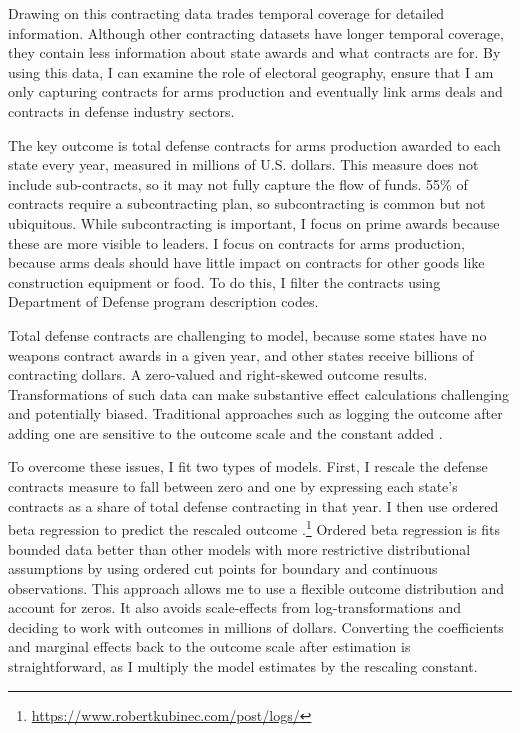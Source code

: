 \documentclass[12pt]{article}
\begin{document}
Drawing on this contracting data trades temporal coverage for detailed information. 
Although other contracting datasets have longer temporal coverage, they contain less information about state awards and what contracts are for. 
By using this data, I can examine the role of electoral geography, ensure that I am only capturing contracts for arms production and 
eventually link arms deals and contracts in defense industry sectors. 


The key outcome is total defense contracts for arms production awarded to each state every year, measured in millions of U.S. dollars.
This measure does not include sub-contracts, so it may not fully capture the flow of funds. 
55\% of contracts require a subcontracting plan, so subcontracting is common but not ubiquitous.  
While subcontracting is important, I focus on prime awards because these are more visible to leaders. 
I focus on contracts for arms production, because arms deals should have little impact on contracts for other goods like construction equipment or food.
To do this, I filter the contracts using Department of Defense program description codes. 


Total defense contracts are challenging to model, because some states have no weapons contract awards in a given year, and other states receive billions of contracting dollars. 
A zero-valued and right-skewed outcome results. 
Transformations of such data can make substantive effect calculations challenging and potentially biased. 
Traditional approaches such as logging the outcome after adding one are sensitive to the outcome scale and the constant added \citep{ChenRoth2022, MullahyNorton2022}. 


To overcome these issues, I fit two types of models.
First, I rescale the defense contracts measure to fall between zero and one by expressing each state's contracts as a share of total defense contracting in that year.
I then use ordered beta regression to predict the rescaled outcome \citep{Kubinec2022}.\footnote{\url{https://www.robertkubinec.com/post/logs/}} 
Ordered beta regression is fits bounded data better than other models with more restrictive distributional assumptions by using ordered cut points for boundary and continuous observations. 
This approach allows me to use a flexible outcome distribution and account for zeros.
It also avoids scale-effects from log-transformations and deciding to work with outcomes in millions of dollars. 
Converting the coefficients and marginal effects back to the outcome scale after estimation is straightforward, as I multiply the model estimates by the rescaling constant.
\end{document}
